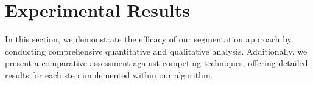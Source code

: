  



    











\section{Experimental Results} \label{sec:results}


In this section, we demonstrate the efficacy of our segmentation approach by conducting comprehensive quantitative and qualitative analysis. Additionally, we present a comparative assessment against competing techniques, offering detailed results for each step implemented within our algorithm.


